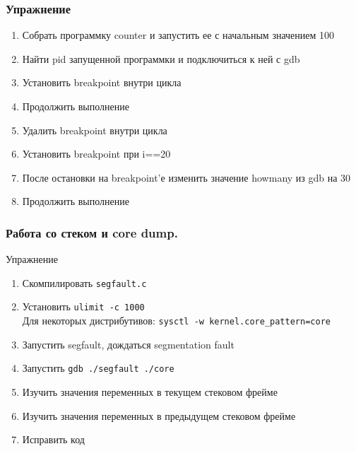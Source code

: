 \begin{frame}
  \frametitle{Упражнение}
  \begin{enumerate}
    \item Собрать программку counter и запустить ее с начальным значением 100
    \item Найти pid запущенной программки и подключиться к ней с gdb
    \item Установить breakpoint внутри цикла
    \item Продолжить выполнение
    \item Удалить breakpoint внутри цикла
    \item Установить breakpoint при i==20
    \item После остановки на breakpoint'е изменить значение howmany из gdb на 30
    \item Продолжить выполнение
  \end{enumerate}
\end{frame}

\begin{frame}
  \frametitle{Работа со стеком и core dump.}
  \begin{center}
    Упражнение
  \end{center}
  \begin{enumerate}
   \item Скомпилировать \texttt{segfault.c}
   \item Установить \texttt{ulimit -c 1000}\\
	   {\small Для некоторых дистрибутивов: {\tt sysctl -w kernel.core\_pattern=core}}
   \item Запустить segfault, дождаться segmentation fault
   \item Запустить \texttt{gdb ./segfault ./core}
   \item Изучить значения переменных в текущем стековом фрейме
   \item Изучить значения переменных в предыдущем стековом фрейме
   \item Исправить код
  \end{enumerate}
\end{frame}

